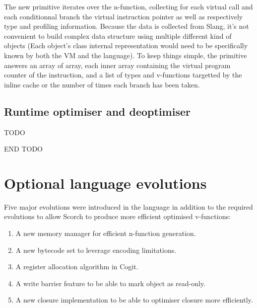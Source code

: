 \documentclass[a4paper,12pt,twoside]{../includes/ThesisStyle}
\begin{document}
The new primitive iterates over the n-function, collecting for each virtual call and each conditionnal branch the virtual instruction pointer as well as respectively type and profiling information. Because the data is collected from Slang, it's not convenient to build complex data structure using multiple different kind of objects (Each object's class internal representation would need to be specifically known by both the VM and the language). To keep things simple, the primitive answers an array of array, each inner array containing the virtual program counter of the instruction, and a list of types and v-functions targetted by the inline cache or the number of times each branch has been taken.

\subsection{Runtime optimiser and deoptimiser}

TODO




END TODO


\section{Optional language evolutions}


Five major evolutions were introduced in the language in addition to the required evolutions to allow Scorch to produce more efficient optimised v-functions:
\begin{enumerate}
	\item A new memory manager for efficient n-function generation.
	\item A new bytecode set to leverage encoding limitations.
	\item A register allocation algorithm in Cogit.
	\item A write barrier feature to be able to mark object as read-only.
	\item A new closure implementation to be able to optimiser closure more efficiently.
\end{enumerate}
\end{document}
